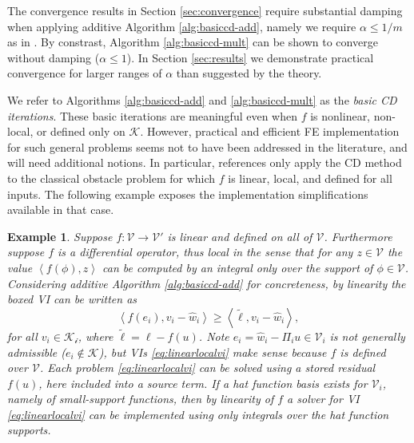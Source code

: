 \documentclass[letterpaper,final,12pt,reqno]{amsart}
\theoremstyle{cstyle}
\theoremstyle{cstyle*}
\theoremstyle{dstyle}
\newtheorem{example}[theorem]{Example}
\numberwithin{equation}{section}
\numberwithin{figure}{section}
\numberwithin{table}{section}
\numberwithin{theorem}{section}
\newcommand{\cK}{\mathcal{K}}
\newcommand{\cV}{\mathcal{V}}
\newcommand{\ip}[2]{\left<#1,#2\right>}
\begin{document}
The convergence results in Section \ref{sec:convergence} require substantial damping when applying additive Algorithm \ref{alg:basiccd-add}, namely we require $\alpha \le 1/m$ as in \cite{Tai2003}.  By constrast, Algorithm \ref{alg:basiccd-mult} can be shown to converge without damping ($\alpha\le 1$).  In Section \ref{sec:results} we demonstrate practical convergence for larger ranges of $\alpha$ than suggested by the theory.

We refer to Algorithms \ref{alg:basiccd-add} and \ref{alg:basiccd-mult} as the \emph{basic CD iterations}.  These basic iterations are meaningful even when $f$ is nonlinear, non-local, or defined only on $\cK$.  However, practical and efficient FE implementation for such general problems seems not to have been addressed in the literature, and will need additional notions.  In particular, references \cite{GraeserKornhuber2009,Tai2003} only apply the CD method to the classical obstacle problem for which $f$ is linear, local, and defined for all inputs.  The following example exposes the implementation simplifications available in that case.

\begin{example}  \label{ex:fnice} Suppose $f:\cV \to \cV'$ is linear and defined on all of $\cV$.  Furthermore suppose $f$ is a differential operator, thus local in the sense that for any $z\in\mathcal{V}$ the value $\ip{f(\phi)}{z}$ can be computed by an integral only over the support of $\phi \in \mathcal{V}$.  Considering additive Algorithm \ref{alg:basiccd-add} for concreteness, by linearity the boxed VI can be written as
\begin{equation}
\ip{f(e_i)}{v_i-\hat w_i} \ge \ip{\tilde\ell}{v_i-\hat w_i}, \label{eq:linearlocalvi}
\end{equation}
for all $v_i \in \mathcal{K_i}$, where $\tilde\ell = \ell - f(u)$.  Note $e_i = \hat w_i - \Pi_i u \in \cV_i$ is not generally admissible ($e_i \notin \cK$), but VIs \eqref{eq:linearlocalvi} make sense because $f$ is defined over $\cV$.  Each problem \eqref{eq:linearlocalvi} can be solved using a stored residual $f(u)$, here included into a source term.  If a hat function basis exists for $\cV_i$, namely of small-support functions, then by linearity of $f$ a solver for VI \eqref{eq:linearlocalvi} can be implemented using only integrals over the hat function supports.
\end{example}
\end{document}
